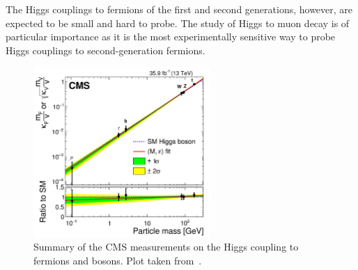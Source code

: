 The Higgs couplings to fermions of the first and second generations, 
however, are expected to be small and hard to probe.
The study of Higgs to muon decay is of particular importance 
as it is the most experimentally sensitive way to probe Higgs couplings to second-generation fermions.
 



\begin{figure}[!htb]
    \centering
    \captionsetup{justification=justified}
    \includegraphics[width=0.60\textwidth]{pics/Intro/higgs_coupling_2016.png}
    \caption{Summary of the CMS measurements on the Higgs coupling to fermions and bosons.
             Plot taken from~\cite{Sirunyan:2640611}. }
    \label{fig:higgs_2016}
\end{figure}


